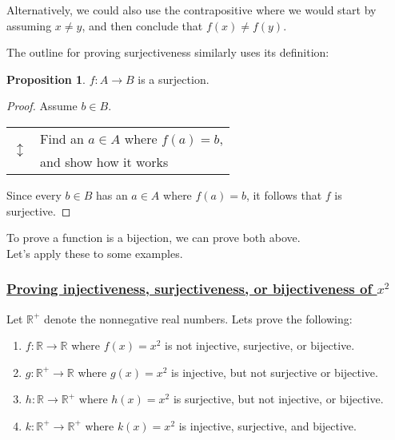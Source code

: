 \documentclass{amsart}
\theoremstyle{definition}
\theoremstyle{definition}
\newtheorem*{prpn}{Proposition}
\theoremstyle{remark}
\begin{document}
Alternatively, we could also use the contrapositive where we would start by assuming $x\neq y$, and then conclude that $f(x) \neq f(y)$.


The outline for proving surjectiveness similarly uses its definition:

\begin{prpn}
      $f:A\rightarrow B$ is a surjection.
\end{prpn}

\begin{proof}
      Assume $b \in B$.

            \begin{center}
            \begin{tabular}{r l}
                  \multirow{2}{*}{\huge $\updownarrow$} & Find an $a \in A$ where $f(a)=b$, \\
                  & and show how it works \\
            \end{tabular}
            \end{center}

            Since every $b\in B$ has an $a \in A$ where $f(a) = b$, it follows that $f$ is surjective.

\end{proof}

To prove a function is a bijection, we can prove both above. \\
Let's apply these to some examples.








\bigskip \bigskip

\subsubsection{\underline{Proving injectiveness, surjectiveness, or bijectiveness of $x^2$}}\hspace*{\fill}
\bigskip

Let $\mathbb{R^+}$ denote the nonnegative real numbers. Lets prove the following:
\begin{enumerate}[label=(\alph*)]
      \item $f : \mathbb{R} \rightarrow \mathbb{R}$ where $f(x)=x^2$ is not injective, surjective, or bijective.
      \item $g : \mathbb{R^+} \rightarrow \mathbb{R}$ where $g(x)=x^2$ is injective, but not surjective or bijective.
      \item $h : \mathbb{R} \rightarrow \mathbb{R^+}$ where $h(x)=x^2$ is surjective, but not injective, or bijective.
      \item $k : \mathbb{R^+} \rightarrow \mathbb{R^+}$ where $k(x)=x^2$ is injective, surjective, and bijective.
\end{enumerate}
\end{document}
